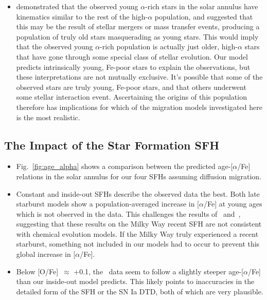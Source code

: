 \documentclass[fleqn, usenatbib]{mnras}
\begin{document}
\begin{itemize}
	\item \citet{SilvaAguirre2018} demonstrated that the observed young 
	$\alpha$-rich stars in the solar annulus have kinematics similar to the 
	rest of the high-$\alpha$ population, and suggested that this may be the 
	result of stellar mergers or mass transfer events, producing a population 
	of truly old stars masquerading as young stars. This would imply that the 
	observed young $\alpha$-rich population is actually just older, 
	high-$\alpha$ stars that have gone through some special class of stellar 
	evolution. Our model predicts intrinsically young, Fe-poor stars to 
	explain the observations, but these interpretations are not mutually 
	exclusive. It's possible that some of the observed stars are truly young, 
	Fe-poor stars, and that others underwent some stellar interaction event. 
	Ascertaining the origins of this population therefore has implications for 
	which of the migration models investigated here is the most realistic. 
\end{itemize} 

\subsection{The Impact of the Star Formation SFH} 
\label{sec:age_alpha:sfh} 
\begin{itemize} 
	\item Fig.~\ref{fig:age_alpha} shows a comparison between 
	the predicted age-[$\alpha$/Fe] relations in the solar annulus for our 
	four SFHs assuming diffusion migration. 

	\item Constant and inside-out SFHs describe the observed data the best. 
	Both late starburst models show a population-averaged increase in 
	[$\alpha$/Fe] at young ages which is not observed in the data. This 
	challenges the results of~\citet{Isern2019} and~\citet{Mor2019}, 
	suggesting that these results on the Milky Way recent SFH are not 
	consistent with chemical evolution models. If the Milky Way truly 
	experienced a recent starburst, something not included in our models had 
	to occur to prevent this global increase in [$\alpha$/Fe]. 

	\item Below [O/Fe]~$\approx$ +0.1, the~\citet{Feuillet2019} data seem to 
	follow a slightly steeper age-[$\alpha$/Fe] than our inside-out model 
	predicts. This likely points to inaccuracies in the detailed form of the 
	SFH or the SN Ia DTD, both of which are very plausible. 
\end{itemize} 
\end{document}
